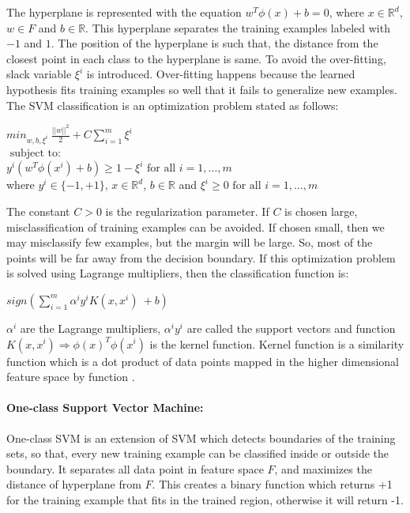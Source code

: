 \documentclass[12pt,oneside,a4paper]{article}
\begin{document}
The hyperplane is represented with the equation $w^{T} \phi(x) + b = 0$, where $x \in \mathbb{R}^d$, $w \in F$ and $b \in \mathbb{R}$. This hyperplane separates the training examples labeled with $-1$ and $1$. The position of the hyperplane is such that, the distance from the closest point in each class to the hyperplane is same. To avoid the over-fitting, slack variable $\xi^{i}$ is introduced. Over-fitting happens because the learned hypothesis fits training examples so well that it fails to generalize new examples. The SVM classification is an optimization problem stated as follows:\cite{svm} \cite{svm-ml}

\begin{center}
  ${min}_{w,b,\xi^i} \ \frac{||w||^2}{2} + C \sum_{i=1}^m \xi^i$ \\
  $\mbox{ subject to: }$ \\
  $y^i( w^T \phi(x^i) + b) \geq 1 - \xi^i \mbox{ for all } i = 1, \dots, m$ \\
  where $y^{i} \in \{-1, +1\}$, $x \in \mathbb{R}^d$, $b \in \mathbb{R}$ and $\xi^i \geq 0 \mbox{ for all } i = 1, \dots, m$ \\
\end{center}

 The constant $C > 0$ is the regularization parameter. If $C$ is chosen large, misclassification of training examples can be avoided. If chosen small, then we may misclassify few examples, but the margin will be large. So, most of the points will be far away from the decision boundary. If this optimization problem is solved using Lagrange multipliers, then the classification function is:

\begin{center}
$sign(\sum_{i=1}^m \alpha^i y^i K(x,x^i) \ + b)$
\end{center}

$\alpha^i$ are the Lagrange multipliers, $\alpha^i y^i$ are called the support vectors and function $K(x,x^i) \Rightarrow \phi(x)^T \phi(x^i)$ is the kernel function. Kernel function is a similarity function which is a dot product of data points mapped in the higher dimensional feature space by function \Phi.

\paragraph{One-class Support Vector Machine:}

One-class SVM is an extension of SVM which detects boundaries of the training sets, so that, every new training example can be classified inside or outside the boundary. It separates all data point in feature space $F$, and maximizes the distance of hyperplane from $F$. This creates a binary function which returns +1 for the training example that fits in the trained region, otherwise it will return -1.
\end{document}
